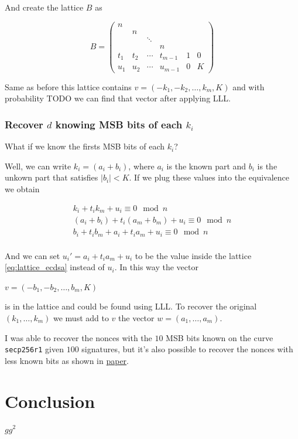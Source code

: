\documentclass[a4paper,12pt]{report}
\begin{document}
\vspace*{10px}

And create the lattice $B$ as

\[
    B = 
    \begin{pmatrix}
     n &  \\
     & n \\
     & & \ddots \\
     & & & n \\
     t_1 & t_2 & \cdots & t_{m-1} & 1 & 0 \\
     u_1 & u_2 & \cdots & u_{m-1} & 0 & K
     \label{eq:lattice_ecdsa}
    \end{pmatrix}
\]

\vspace*{10px}

Same as before this lattice contains $v = (-k_1, -k_2, \ldots, k_m, K)$ and with probability TODO we can find that vector after applying LLL.

\subsection{Recover $d$ knowing MSB bits of each $k_i$}

What if we know the firsts MSB bits of each $k_i$?

Well, we can write $k_i = (a_i + b_i)$, where $a_i$ is the known part and $b_i$ is the unkown part that satisfies $|b_i| < K$. If we plug these values
into the equivalence we obtain

\[
    \begin{array}{c}
        k_i + t_ik_m + u_i \equiv 0 \mod n \\
        (a_i + b_i) + t_i(a_m + b_m) + u_i \equiv 0 \mod n \\
        b_i + t_ib_m + a_i + t_ia_m + u_i \equiv 0 \mod n \\
    \end{array}
\]

And we can set $u_i' = a_i + t_ia_m + u_i$ to be the value inside the lattice \ref{eq:lattice_ecdsa} instead of $u_i$. In this way the vector

\begin{center}
    $v = (-b_1, -b_2, \ldots, b_m, K)$
\end{center}

is in the lattice and could be found using LLL. To recover the original $(k_1, \ldots, k_m)$ we must add to $v$ the vector $w = (a_1, \ldots, a_m)$.

I was able to recover the nonces with the $10$ MSB bits known on the curve \texttt{secp256r1} given $100$ signatures, but it's also possible
to recover the nonces with less known bits as shown in \href{https://eprint.iacr.org/2020/1540}{paper}.

\chapter*{Conclusion}

$gg^2$



\end{document}
